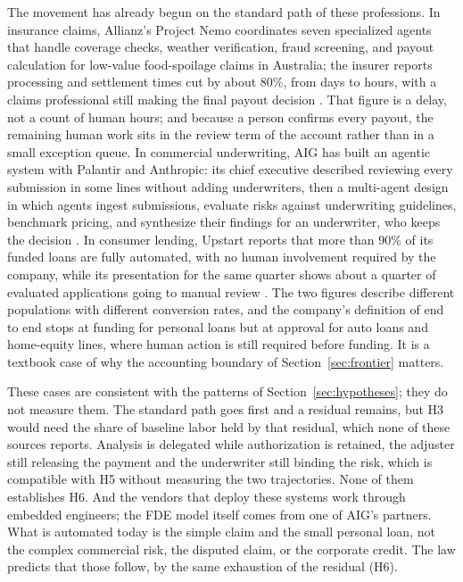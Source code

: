 The movement has already begun on the standard path of these professions. In insurance claims,
Allianz's Project Nemo coordinates seven specialized agents that handle coverage checks, weather
verification, fraud screening, and payout calculation for low-value food-spoilage claims in Australia;
the insurer reports processing and settlement times cut by about 80\%, from days to hours, with a claims
professional still making the final payout decision \citep{allianz2025}. That figure is a delay, not a
count of human hours; and because a person confirms every payout, the remaining human work sits in the
review term of the account rather than in a small exception queue. In commercial underwriting, AIG has built an
agentic system with Palantir and Anthropic: its chief executive described reviewing every submission
in some lines without adding underwriters, then a multi-agent design in which agents ingest
submissions, evaluate risks against underwriting guidelines, benchmark pricing, and synthesize their
findings for an underwriter, who keeps the decision
\citep{insurancejournal2025,reinsurancenews2026}. In consumer lending, Upstart reports that more than 90\% of its funded loans
are fully automated, with no human involvement required by the company, while its presentation for the
same quarter shows about a quarter of evaluated applications going to manual review
\citep{upstart2026}. The two figures describe different populations with different conversion rates,
and the company's definition of end to end stops at funding for personal loans but at approval for auto
loans and home-equity lines, where human action is still required before funding. It is a textbook
case of why the accounting boundary of Section~\ref{sec:frontier} matters.

These cases are consistent with the patterns of Section~\ref{sec:hypotheses}; they do not measure them.
The standard path goes first and a residual remains, but H3 would need the share of baseline labor held
by that residual, which none of these sources reports. Analysis is delegated while authorization is
retained, the adjuster still releasing the payment and the underwriter still binding the risk, which is
compatible with H5 without measuring the two trajectories. None of them establishes H6. And the vendors that deploy these systems work
through embedded engineers; the FDE model itself comes from one of AIG's partners. What is automated
today is the simple claim and the small personal loan, not the complex commercial risk, the disputed
claim, or the corporate credit. The law predicts that those follow, by the same exhaustion of the
residual (H6).

